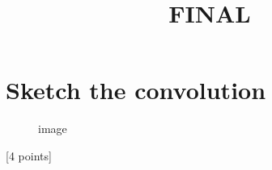 \documentclass[11pt]{article}
\title{FINAL}
\begin{document}
    
    \maketitle
    
    

    
    \section{Sketch the convolution}\label{sketch-the-convolution}

\begin{figure}
\centering
{}
\caption{image}
\end{figure}

{[}4 points{]}
\end{document}

